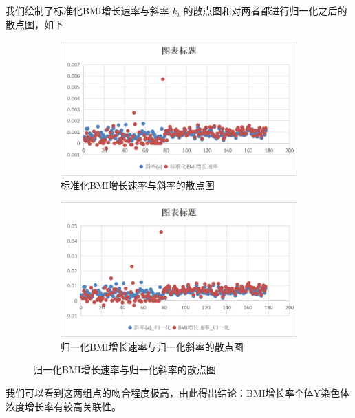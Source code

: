 \documentclass{article}
\begin{document}
我们绘制了标准化BMI增长速率与斜率 $k_i$ 的散点图和对两者都进行归一化之后的散点图，如下
\begin{figure}[H]
    \centering
    \begin{subfigure}[b]{0.45\textwidth}  %
        \centering
        \includegraphics[width=\textwidth]{graph/biaozhunhua.png}  %
        \caption{标准化BMI增长速率与斜率的散点图}  %
        \label{fig:sub1}  %
    \end{subfigure}
    \hspace{0.05\textwidth}  %
    \begin{subfigure}[b]{0.45\textwidth}
        \centering
        \includegraphics[width=\textwidth]{graph/guiyihua.png}
        \caption{归一化BMI增长速率与归一化斜率的散点图}
        \label{fig:sub2}
    \end{subfigure}
    \label{fig:two}  %
\end{figure}
我们可以看到这两组点的吻合程度极高，由此得出结论：BMI增长率个体Y染色体浓度增长率有较高关联性。
\end{document}
